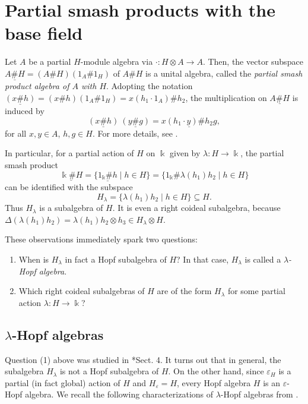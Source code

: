 \documentclass[reqno]{amsart}
\theoremstyle{definition}
\numberwithin{equation}{section}\theoremstyle{plain}
\theoremstyle{definition}
\def \k {\Bbbk}
\begin{document}
\section{Partial smash products with the base field}


	Let $A$ be a partial $H$-module algebra via $\cdot : H \otimes A \longrightarrow A$.
    Then, the vector subspace $\underline{ A \# H}=(A\# H)(1_A\# 1_H)$ of \(A \# H\) is a unital algebra, called the \emph{partial smash product algebra of $A$ with $H$}. Adopting the notation $\underline{(x\#h)} = (x \# h)(1_A \# 1_H) = x(h_1\cdot 1_A)\# h_2$, the multiplication on \(\underline{A \# H}\) is induced by
	$$\underline{(x\#h)} \ \underline{(y\#g)}=\underline{x(h_1\cdot y)\# h_2g},$$
	for all $x,y\in A$, $h,g\in H$. For more details, see \cite{caenepeel2008partial}.

In particular, for a partial action of $H$ on $\k$ given by $\lambda: H \longrightarrow \k$, the partial smash product 
\begin{equation}
    \underline{\Bbbk \# H} = \{ \underline{1_\Bbbk \# h} \mid h \in H \} = \{ 1_\Bbbk \# \lambda(h_1) h_2 \mid h \in H \}
\end{equation}
can be identified with the subspace
\begin{equation} 
    H_\lambda = \{\lambda(h_1) h_2 \mid h \in H\} \subseteq H.
\end{equation}
Thus \(H_\lambda\) is a subalgebra of \(H\). It is even a right coideal subalgebra, because \(\Delta(\lambda(h_1)h_2) = \lambda(h_1) h_2 \otimes h_3 \in H_\lambda \otimes H\).

These observations immediately spark two questions:
\begin{enumerate}
    \item When is \(H_{\lambda}\) in fact a Hopf subalgebra of \(H\)? In that case, \(H_\lambda\) is called a \textit{\(\lambda\)-Hopf algebra}.
    \item Which right coideal subalgebras of \(H\) are of the form \(H_\lambda\) for some partial action \(\lambda : H \to \Bbbk\)?
\end{enumerate}

\subsection{\texorpdfstring{$\lambda$-Hopf}{Lambda-Hopf} algebras}\label{lambda_Hopf}

Question (1) above was studied in \cite{corresponding}*{Sect. 4}. It turns out that in general, the subalgebra $H_\lambda$ is not a Hopf subalgebra of $H$. 
On the other hand, since $\varepsilon_H$ is a partial (in fact global) action of $H$ and $H_\varepsilon = H$, every Hopf algebra $H$ is an $\varepsilon$-Hopf algebra.
We recall the following characterizations of \(\lambda\)-Hopf algebras from \cite{corresponding}.
\end{document}

